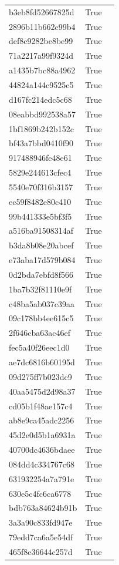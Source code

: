 \begin{tabular}{lrl}
b3eb8fd52667825d & True &  \\
2896b11b662c99b4 & True &  \\
def8c9282be8be99 & True &  \\
71a2217a99f9324d & True &  \\
a1435b7bc88a4962 & True &  \\
44824a144c9525c5 & True &  \\
d167fc214edc5c68 & True &  \\
08eabbd992538a57 & True &  \\
1bf1869b242b152c & True &  \\
bf43a7bbd0410f90 & True &  \\
917488946fe48e61 & True &  \\
5829e244613cfec4 & True &  \\
5540e70f316b3157 & True &  \\
ec59f8482e80c410 & True &  \\
99b441333e5bf3f5 & True &  \\
a516ba91508314af & True &  \\
b3da8b08e20abcef & True &  \\
e73aba17d579b084 & True &  \\
0d2bda7ebfd8f566 & True &  \\
1ba7b32f81110e9f & True &  \\
c48ba5ab037c39aa & True &  \\
09c178bb4ee615c5 & True &  \\
2f646cba63ac46ef & True &  \\
fec5a40f26eec1d0 & True &  \\
ae7dc6816b60195d & True &  \\
09d275ff7b023dc9 & True &  \\
40aa5475d2d98a37 & True &  \\
cd05b1f48ae157c4 & True &  \\
ab8e9ca45adc2256 & True &  \\
45d2e0d5b1a6931a & True &  \\
40700dc4636bdaee & True &  \\
084dd4c334767c68 & True &  \\
631932254a7a791e & True &  \\
630e5c4fc6ca6778 & True &  \\
bdb763a84624b91b & True &  \\
3a3a90c833fd947e & True &  \\
79edd7ca6a5e54df & True &  \\
465f8e36644c257d & True &  \\

\end{tabular}
